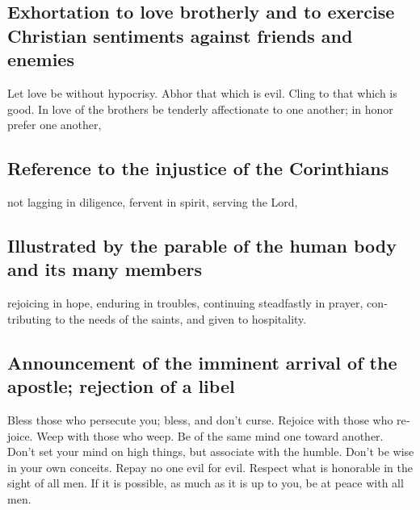 \begin{paracol}{2}
\begin{otherlanguage}{english}
\hypertarget{exhortation-to-love-brotherly-and-to-exercise-christian-sentiments-against-friends-and-enemies}{%
\subsection{Exhortation to love brotherly and to exercise Christian
sentiments against friends and
enemies}\label{exhortation-to-love-brotherly-and-to-exercise-christian-sentiments-against-friends-and-enemies}}

 Let love be without hypocrisy. Abhor that which is evil.
Cling to that which is good.  In love of the brothers be
tenderly affectionate to one another; in honor prefer one another,

\hypertarget{reference-to-the-injustice-of-the-corinthians}{%
\subsection{Reference to the injustice of the
Corinthians}\label{reference-to-the-injustice-of-the-corinthians}}

 not lagging in diligence, fervent in spirit, serving the
Lord,

\hypertarget{illustrated-by-the-parable-of-the-human-body-and-its-many-members}{%
\subsection{Illustrated by the parable of the human body and its many
members}\label{illustrated-by-the-parable-of-the-human-body-and-its-many-members}}

 rejoicing in hope, enduring in troubles, continuing
steadfastly in prayer,  contributing to the needs of the
saints, and given to hospitality.

\hypertarget{announcement-of-the-imminent-arrival-of-the-apostle-rejection-of-a-libel}{%
\subsection{Announcement of the imminent arrival of the apostle;
rejection of a
libel}\label{announcement-of-the-imminent-arrival-of-the-apostle-rejection-of-a-libel}}

 Bless those who persecute you; bless, and don't curse.
 Rejoice with those who rejoice. Weep with those who
weep.  Be of the same mind one toward another. Don't set
your mind on high things, but associate with the humble. Don't be wise
in your own conceits.  Repay no one evil for evil.
Respect what is honorable in the sight of all men.  If it
is possible, as much as it is up to you, be at peace with all men.


\end{otherlanguage}
\end{paracol}
